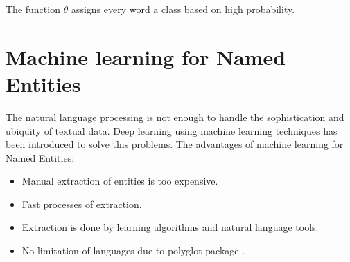 The function $\theta$  assigns every word a class based on high probability.


\section{Machine learning for Named Entities\label{Chapter2}}
The natural language processing is not enough to handle the sophistication and ubiquity of textual data. Deep learning using machine learning techniques has been introduced to solve this problems. The advantages of machine learning for Named Entities:
\begin{itemize}
\item Manual extraction of entities is too expensive.
\item Fast processes of extraction.
\item Extraction is done by learning algorithms and natural language tools.
\item No limitation of languages due to polyglot package .
\end{itemize}

